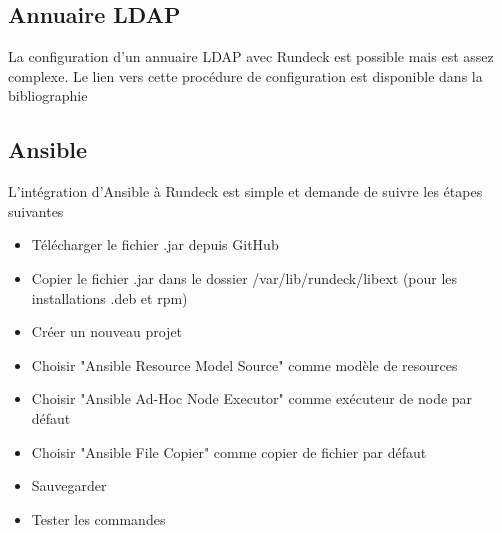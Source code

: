\documentclass[12pt]{article}
\begin{document}
\subsection{Annuaire LDAP}
La configuration d'un annuaire LDAP avec Rundeck est possible mais est assez complexe. Le lien vers cette procédure de configuration est disponible dans la bibliographie

\subsection{Ansible}
L'intégration d'Ansible à Rundeck est simple et demande de suivre les étapes suivantes
\begin{itemize}
    \item Télécharger le fichier .jar depuis GitHub 
    \item Copier le fichier .jar dans le dossier /var/lib/rundeck/libext (pour les installations .deb et rpm)
    \item Créer un nouveau projet
    \item Choisir "Ansible Resource Model Source" comme modèle de resources
    \item Choisir "Ansible Ad-Hoc Node Executor" comme exécuteur de node par défaut
    \item Choisir "Ansible File Copier" comme copier de fichier par défaut
    \item Sauvegarder
    \item Tester les commandes
\end{itemize}

\newpage
\end{document}

